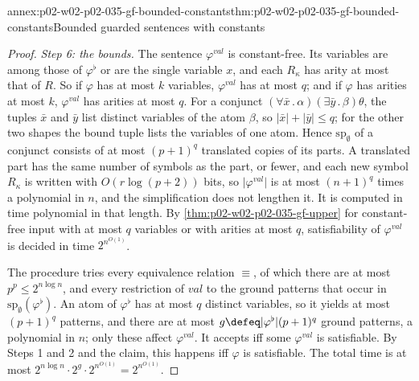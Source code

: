 \begin{annexitem}{annex:p02-w02-p02-035-gf-bounded-constants}{thm:p02-w02-p02-035-gf-bounded-constants}{Bounded guarded sentences with constants}
\begin{proof}
\emph{Step 6: the bounds.}  The sentence \(\varphi^{\mathit{val}}\) is
constant-free.  Its variables are among those of \(\varphi^{\flat}\) or are
the single variable \(x\), and each \(R_\kappa\) has arity at most that of
\(R\).  So if \(\varphi\) has at most \(k\) variables, \(\varphi^{\mathit{val}}\)
has at most \(q\); and if \(\varphi\) has arities at most \(k\),
\(\varphi^{\mathit{val}}\) has arities at most \(q\).  For a conjunct
\((\forall\bar x\,.\,\alpha)(\exists\bar y\,.\,\beta)\theta\), the tuples
\(\bar x\) and \(\bar y\) list distinct variables of the atom \(\beta\), so
\(\lvert\bar x\rvert+\lvert\bar y\rvert\leq q\); for the other two shapes the
bound tuple lists the variables of one atom.  Hence
\(\mathrm{sp}_\emptyset\) of a conjunct consists of at most \((p+1)^{q}\)
translated copies of its parts.  A translated part has the same number of
symbols as the part, or fewer, and each new symbol \(R_\kappa\) is written with
\(O(r\log(p+2))\) bits, so \(\lvert\varphi^{\mathit{val}}\rvert\) is at most
\((n+1)^{q}\) times a polynomial in \(n\), and the simplification does not
lengthen it.  It is computed in time polynomial in that length.  By
\cref{thm:p02-w02-p02-035-gf-upper} for constant-free input with at most
\(q\) variables or with arities at most \(q\), satisfiability of
\(\varphi^{\mathit{val}}\) is decided in time \(2^{n^{O(1)}}\).

The procedure tries every equivalence relation \(\equiv\), of which there are
at most \(p^{p}\leq2^{n\log n}\), and every restriction of \(\mathit{val}\) to
the ground patterns that occur in \(\mathrm{sp}_\emptyset(\varphi^{\flat})\).
An atom of \(\varphi^{\flat}\) has at most \(q\) distinct variables, so it
yields at most \((p+1)^{q}\) patterns, and there are at most
\(g\defeq\lvert\varphi^{\flat}\rvert(p+1)^{q}\) ground patterns, a polynomial
in \(n\); only these affect \(\varphi^{\mathit{val}}\).  It accepts iff some
\(\varphi^{\mathit{val}}\) is satisfiable.  By Steps 1 and 2 and the claim,
this happens iff \(\varphi\) is satisfiable.  The total time is at most
\(2^{n\log n}\cdot2^{g}\cdot2^{n^{O(1)}}=2^{n^{O(1)}}\).
\end{proof}
\end{annexitem}


